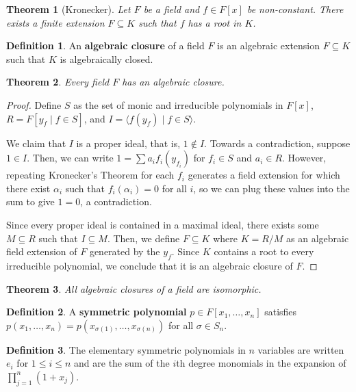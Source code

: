 \documentclass[
    parskip=half,
    toc=flat,
    toc=sectionentrydotfill,
]{scrartcl}  %
\theoremstyle{definition}
\newtheorem{definition}{Definition}[section]
\theoremstyle{plain}
\newtheorem{theorem}{Theorem}[section]
\theoremstyle{remark}
\begin{document}
\begin{theorem}[Kronecker]
    Let $F$ be a field and $f\in F[x]$ be non-constant.
    There exists a finite extension $F\subseteq K$ such that $f$ has a root in
    $K$.
\end{theorem}

\begin{definition}
    An \textbf{algebraic closure} of a field $F$ is an algebraic extension
    $F\subseteq K$ such that $K$ is algebraically closed.
\end{definition}

\begin{theorem}
    Every field $F$ has an algebraic closure.
\end{theorem}

\begin{proof}
    Define $S$ as the set of monic and irreducible polynomials in $F[x]$,
    $R=F[y_f\mid f\in S]$, and $I=\langle f(y_f)\mid f\in S\rangle$.

    We claim that $I$ is a proper ideal, that is, $1\notin I$.
    Towards a contradiction, suppose $1\in I$.
    Then, we can write $1=\sum a_if_i(y_{f_i})$ for $f_i\in S$ and $a_i\in R$.
    However, repeating Kronecker's Theorem for each $f_i$ generates a field
    extension for which there exist $\alpha_i$ such that $f_i(\alpha_i)=0$ for
    all $i$, so we can plug these values into the sum to give $1=0$, a
    contradiction.

    Since every proper ideal is contained in a maximal ideal, there exists some
    $M\subseteq R$ such that $I\subseteq M$.
    Then, we define $F\subseteq K$ where $K=R/M$ as an algebraic field
    extension of $F$ generated by the $y_f$.
    Since $K$ contains a root to every irreducible polynomial, we conclude that
    it is an algebraic closure of $F$.
\end{proof}

\begin{theorem}
    All algebraic closures of a field are isomorphic.
\end{theorem}

\begin{definition}
    A \textbf{symmetric polynomial} $p\in F[x_1,\dots,x_n]$ satisfies
    $p(x_1,\dots,x_n)=p(x_{\sigma(1)},\dots,x_{\sigma(n)})$ for all
    $\sigma\in S_n$.
\end{definition}

\begin{definition}
    The elementary symmetric polynomials in $n$ variables are written $e_i$ for
    $1\leq i\leq n$ and are the sum of the $i$th degree monomials in the
    expansion of $\prod_{j=1}^n(1+x_j)$.
\end{definition}
\end{document}
